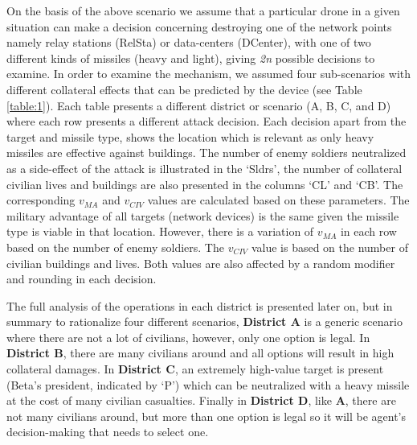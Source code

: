 On the basis of the above scenario we assume that a particular drone in a given situation can make a decision concerning destroying one of the network points namely relay stations (RelSta) or data-centers (DCenter), with one of two different kinds of missiles (heavy and light), giving \textit{2n} possible decisions to examine. In order to examine the mechanism, we assumed four sub-scenarios with different collateral effects that can be predicted by the device (see Table \ref{table:1}). Each table presents a different district or scenario (A, B, C, and D) where each row presents a different attack decision. Each decision apart from the target and missile type, shows the location which is relevant as only heavy missiles are effective against buildings. The number of enemy soldiers neutralized as a side-effect of the attack is illustrated in the `Sldrs', the number of collateral civilian lives and buildings are also presented in the columns `CL' and `CB'. The corresponding $v_{MA}$ and $v_{CIV}$ values are calculated based on these parameters. The military advantage of all targets (network devices) is the same given the missile type is viable in that location. However, there is a variation of $v_{MA}$ in each row based on the number of enemy soldiers. The $v_{CIV}$ value is based on the number of civilian buildings and lives. Both values are also affected by a random modifier and rounding in each decision.

The full analysis of the operations in each district is presented later on, but in summary to rationalize four different scenarios, \textbf{District A} is a generic scenario where there are not a lot of civilians, however, only one option is legal. In \textbf{District B}, there are many civilians around and all options will result in high collateral damages. In \textbf{District C}, an extremely high-value target is present (Beta's president, indicated by `P') which can be neutralized with a heavy missile at the cost of many civilian casualties. Finally in \textbf{District D}, like \textbf{A}, there are not many civilians around, but more than one option is legal so it will be agent's decision-making that needs to select one.



